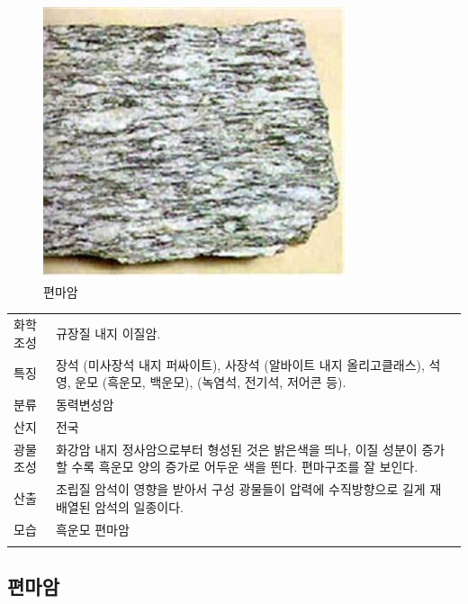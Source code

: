 \documentclass[12pt, a4paper, twoside]{book}
\begin{document}
				\begin{figure}[h]
				\centering
				\caption{편마암}
				\includegraphics[width=0.8\textwidth]{./fig/gneiss_0002.jpg}
				\end{figure}



				\begin{tabu} to 1.0\textwidth { X[l, 1.0] X[l, 3.0] }
				\tabucline[0.2ex]{-}		
				화학조성		&				규장질 내지 이질암. \\
				특징			&				장석 (미사장석 내지 퍼싸이트), 사장석 (알바이트 내지 올리고클래스), 석영, 운모 (흑운모, 백운모), (녹염석, 전기석, 저어콘 등).\\
				분류			&				동력변성암 \\
				산지 		&				전국 \\
				광물조성 		&				화강암 내지 정사암으로부터 형성된 것은 밝은색을 띄나, 이질 성분이 증가할 수록 흑운모 양의 증가로 어두운 색을 띈다. 편마구조를 잘 보인다.  \\
				산출 		&				조립질 암석이 영향을 받아서 구성 광물들이 압력에 수직방향으로 길게 재 배열된 암석의 일종이다. \\
				모습 		&				흑운모 편마암 \\
				\tabucline[0.1ex]{-}		
				\end{tabu} 







		\subsection{편마암}
\end{document}
